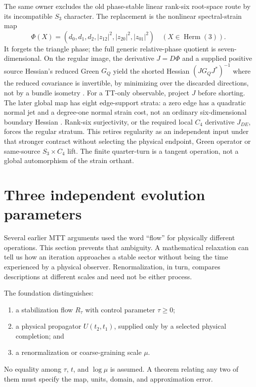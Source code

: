 \documentclass[11pt]{article}
\begin{document}
\label{sec:consumer-strain}
The same owner excludes the old phase-stable linear rank-six root-space
route by its incompatible $S_3$ character. The replacement is the nonlinear
spectral-strain map
\[
 \Phi(X)=(d_0,d_1,d_2,|z_{12}|^2,|z_{20}|^2,|z_{01}|^2)
 \quad (X\in\operatorname{Herm}(3)).
\]
It forgets the triangle phase; the full generic relative-phase quotient is
seven-dimensional. On the regular image, the derivative $J=D\Phi$ and a
supplied positive source Hessian's reduced Green $G_Q$ yield the shorted
Hessian $(JG_QJ^*)^{-1}$ where the reduced covariance is invertible, by
minimizing over the discarded directions, not
by a bundle isometry \cite{FrozenStrain}. For a TT-only observable, project
$J$ before shorting. The later global map has eight edge-support strata:
a zero edge has a quadratic normal jet and a degree-one normal strain cost,
not an ordinary six-dimensional boundary Hessian \cite{FrozenSupport}.
Rank-six surjectivity, or the required local $C_4$ derivative $J_{DE}$,
forces the regular stratum. This retires regularity as an independent input
under that stronger contract without selecting the physical endpoint,
Green operator or same-source $S_3\times C_4$ lift. The finite quarter-turn
is a tangent operation, not a global automorphism of the strain orthant.

\section{Three independent evolution parameters}

Several earlier MTT arguments used the word ``flow'' for physically different
operations. This section prevents that ambiguity. A mathematical relaxation
can tell us how an iteration approaches a stable sector without being the
time experienced by a physical observer. Renormalization, in turn, compares
descriptions at different scales and need not be either process.

The foundation distinguishes:
\begin{enumerate}
\item a stabilization flow $R_\tau$ with control parameter $\tau\ge0$;
\item a physical propagator $U(t_2,t_1)$, supplied only by a selected physical
completion; and
\item a renormalization or coarse-graining scale $\mu$.
\end{enumerate}
No equality among $\tau$, $t$, and $\log\mu$ is assumed. A theorem relating any
two of them must specify the map, units, domain, and approximation error.
\end{document}
